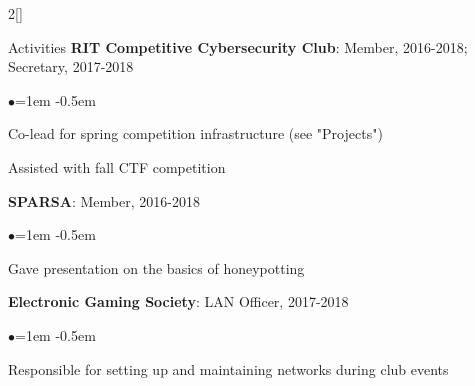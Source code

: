 \documentclass[8pt]{resume} %
\begin{document}
\begin{multicols}{2}[]
\begin{rSection}{Activities}
    {\bf RIT Competitive Cybersecurity Club}: Member, 2016-2018; Secretary,
    2017-2018
    \begin{list}{$\bullet$}{\leftmargin=1em}
    \itemsep -0.5em \vspace{-0.5em}
    \item Co-lead for spring competition infrastructure (see "Projects")
    \item Assisted with fall CTF competition
    \end{list}

    {\bf SPARSA}: Member, 2016-2018
    \begin{list}{$\bullet$}{\leftmargin=1em}
    \itemsep -0.5em \vspace{-0.5em}
    \item Gave presentation on the basics of honeypotting
    \end{list}

    {\bf Electronic Gaming Society}: LAN Officer, 2017-2018
    \begin{list}{$\bullet$}{\leftmargin=1em}
    \itemsep -0.5em \vspace{-0.5em}
    \item Responsible for setting up and maintaining networks during club
        events
    \end{list}

\end{rSection}


\end{multicols}

\end{document}
